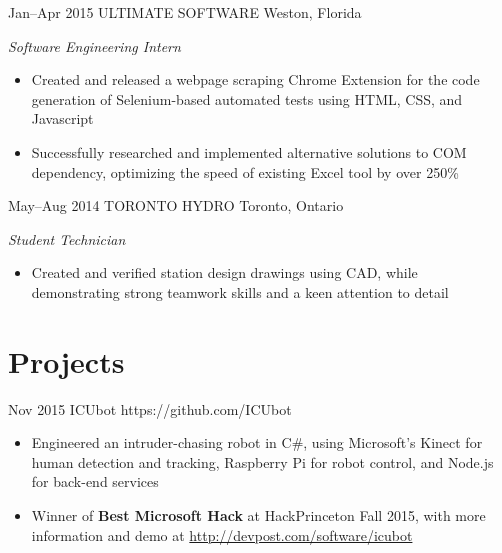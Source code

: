 \documentclass[print]{friggeri-cv} %
\begin{document}
\begin{entrylist}
\entry
{Jan--Apr 2015}
{ULTIMATE SOFTWARE}
{Weston, Florida}
{\emph{Software Engineering Intern}
\begin{itemize}
\item Created and released a webpage scraping Chrome Extension for the code generation of Selenium-based automated tests using HTML, CSS, and Javascript 
\item Successfully researched and implemented alternative solutions to COM \\ dependency, optimizing the speed of existing Excel tool by over 250\%
\end{itemize}}
\end{entrylist}


\begin{entrylist}
\entry
{May--Aug 2014}
{TORONTO HYDRO}
{Toronto, Ontario}
{\emph{Student Technician}
\begin{itemize}
\item Created and verified station design drawings using CAD, while \\ demonstrating strong teamwork skills and a keen attention to detail  
\end{itemize}
}
\end{entrylist}


\section{Projects}

\begin{projlist}
\proj
{Nov 2015}
{ICUbot}
{https://github.com/ICUbot}
{
\begin{itemize}
\item Engineered an intruder-chasing robot in C\#, using Microsoft's Kinect for human detection and tracking, Raspberry Pi for robot control, and Node.js for back-end services
\item Winner of \textbf{Best Microsoft Hack} at HackPrinceton Fall 2015, with more information and demo at \href{http://devpost.com/software/icubot}{http://devpost.com/software/icubot}
\end{itemize}}
\end{projlist}
\end{document}
